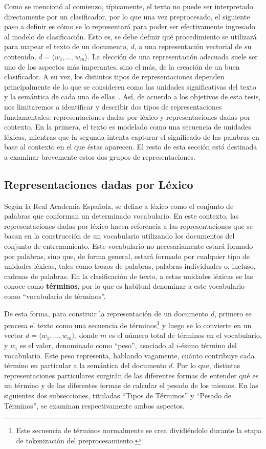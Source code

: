 Como se mencionó al comienzo, típicamente, el texto no puede ser interpretado directamente por un clasificador, por lo que una vez preprocesado, el siguiente paso a definir es cómo se lo representará para poder ser efectivamente ingresado al modelo de clasificación.
Esto es, se debe definir qué procedimiento se utilizará para mapear el texto de un documento, $d$, a una representación vectorial de su contenido, $d=\langle w_1,\dots,w_m\rangle$.
La elección de una representación adecuada suele ser uno de los aspectos más imperantes, sino el más, de la creación de un buen clasificador.
A su vez, los distintos tipos de representaciones dependen principalmente de lo que se consideren como las unidades significativas del texto y la semántica de cada una de ellas~\cite{turney2010frequency}.
Así, de acuerdo a los objetivos de esta tesis, nos limitaremos a identificar y describir dos tipos de representaciones fundamentales: representaciones dadas por léxico y representaciones dadas por contexto.
En la primera, el texto es modelado como una secuencia de unidades léxicas, mientras que la segunda intenta capturar el significado de las palabras en base al contexto en el que éstas aparecen. El resto de esta sección está destinada a examinar brevemente estos dos grupos de representaciones.


\subsection{Representaciones dadas por Léxico}


Según la Real Academia Española, se define a léxico como el conjunto de palabras que conforman un determinado vocabulario.
En este contexto, las representaciones dadas por léxico hacen referencia a las representaciones que se basan en la construcción de un vocabulario utilizando los documentos del conjunto de entrenamiento.
Este vocabulario no necesariamente estará formado por palabras, sino que, de forma general, estará formado por cualquier tipo de unidades léxicas, tales como trozos de palabras, palabras individuales o, incluso, cadenas de palabras.
En la clasificación de texto, a estas unidades léxicas se las conoce como \textbf{términos}, por lo que es habitual denominar a este vocabulario como ``vocabulario de términos''.

De esta forma, para construir la representación de un documento $d$, primero se procesa el texto como una secuencia de términos\footnote{Este secuencia de términos normalmente se crea dividiéndolo durante la etapa de tokenización del preprocesamiento.} y luego se lo convierte en un vector $d=\langle w_1,\dots,w_m\rangle$, donde $m$ es el número total de términos en el vocabulario, y $w_i$ es el valor, denominado como ``peso'', asociado al $i$-ésimo término del vocabulario.
Este peso representa, hablando vagamente, cuánto contribuye cada término en particular a la semántica del documento $d$.
Por lo que, distintas representaciones particulares surgirán de las diferentes formas de entender qué es un término y de las diferentes formas de calcular el pesado de los mismos. En las siguientes dos subsecciones, tituladas ``Tipos de Términos'' y ``Pesado de Términos'', se examinan respectivamente ambos aspectos.

